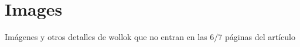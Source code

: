 \documentclass{article}
\begin{document}
% 
% 

% 




\appendix
\section{Images}
Imágenes y otros detalles de wollok que no entran en las 6/7 páginas del artículo
\end{document}
